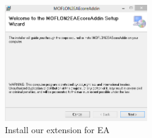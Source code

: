 \begin{enumerate}
\begin{figure}[htbp]
	\centering
  \includegraphics[width=0.55\textwidth]{pics/installationAndSetup/eaplugin_install.png}
	\caption{Install our extension for EA}
	\label{fig_eaPluginWizard}
\end{figure}
\end{enumerate}
 
